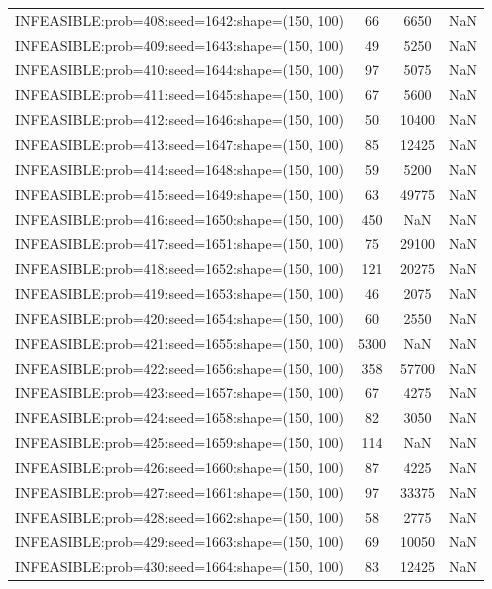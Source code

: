 \begin{longtable}{lccc}
INFEASIBLE:prob=408:seed=1642:shape=(150, 100) &    66 &  6650 &    NaN \\
INFEASIBLE:prob=409:seed=1643:shape=(150, 100) &    49 &  5250 &    NaN \\
INFEASIBLE:prob=410:seed=1644:shape=(150, 100) &    97 &  5075 &    NaN \\
INFEASIBLE:prob=411:seed=1645:shape=(150, 100) &    67 &  5600 &    NaN \\
INFEASIBLE:prob=412:seed=1646:shape=(150, 100) &    50 & 10400 &    NaN \\
INFEASIBLE:prob=413:seed=1647:shape=(150, 100) &    85 & 12425 &    NaN \\
INFEASIBLE:prob=414:seed=1648:shape=(150, 100) &    59 &  5200 &    NaN \\
INFEASIBLE:prob=415:seed=1649:shape=(150, 100) &    63 & 49775 &    NaN \\
INFEASIBLE:prob=416:seed=1650:shape=(150, 100) &   450 &   NaN &    NaN \\
INFEASIBLE:prob=417:seed=1651:shape=(150, 100) &    75 & 29100 &    NaN \\
INFEASIBLE:prob=418:seed=1652:shape=(150, 100) &   121 & 20275 &    NaN \\
INFEASIBLE:prob=419:seed=1653:shape=(150, 100) &    46 &  2075 &    NaN \\
INFEASIBLE:prob=420:seed=1654:shape=(150, 100) &    60 &  2550 &    NaN \\
INFEASIBLE:prob=421:seed=1655:shape=(150, 100) &  5300 &   NaN &    NaN \\
INFEASIBLE:prob=422:seed=1656:shape=(150, 100) &   358 & 57700 &    NaN \\
INFEASIBLE:prob=423:seed=1657:shape=(150, 100) &    67 &  4275 &    NaN \\
INFEASIBLE:prob=424:seed=1658:shape=(150, 100) &    82 &  3050 &    NaN \\
INFEASIBLE:prob=425:seed=1659:shape=(150, 100) &   114 &   NaN &    NaN \\
INFEASIBLE:prob=426:seed=1660:shape=(150, 100) &    87 &  4225 &    NaN \\
INFEASIBLE:prob=427:seed=1661:shape=(150, 100) &    97 & 33375 &    NaN \\
INFEASIBLE:prob=428:seed=1662:shape=(150, 100) &    58 &  2775 &    NaN \\
INFEASIBLE:prob=429:seed=1663:shape=(150, 100) &    69 & 10050 &    NaN \\
INFEASIBLE:prob=430:seed=1664:shape=(150, 100) &    83 & 12425 &    NaN \\

\end{longtable}
